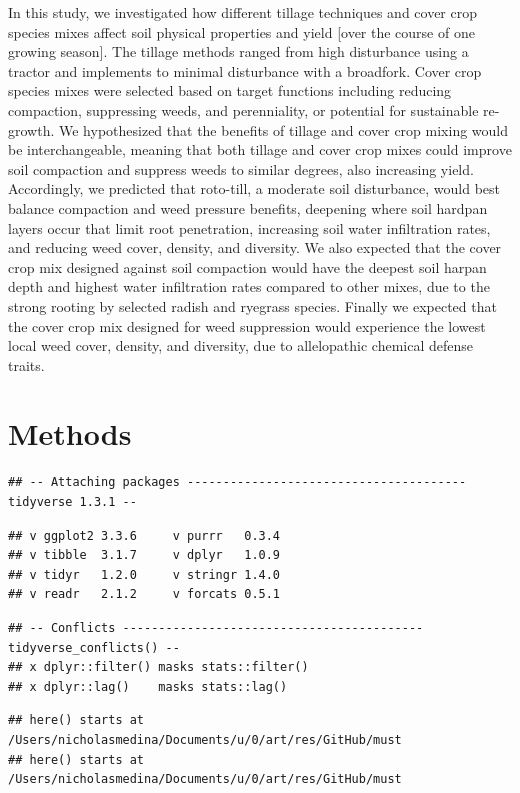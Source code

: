 \documentclass[
]{article}
\begin{document}
In this study, we investigated how different tillage techniques and cover crop species mixes affect soil physical properties and yield {[}over the course of one growing season{]}.
The tillage methods ranged from high disturbance using a tractor and implements to minimal disturbance with a broadfork.
Cover crop species mixes were selected based on target functions including reducing compaction, suppressing weeds, and perenniality, or potential for sustainable re-growth.
We hypothesized that the benefits of tillage and cover crop mixing would be interchangeable, meaning that both tillage and cover crop mixes could improve soil compaction and suppress weeds to similar degrees, also increasing yield.
Accordingly, we predicted that roto-till, a moderate soil disturbance, would best balance compaction and weed pressure benefits, deepening where soil hardpan layers occur that limit root penetration, increasing soil water infiltration rates, and reducing weed cover, density, and diversity.
We also expected that the cover crop mix designed against soil compaction would have the deepest soil harpan depth and highest water infiltration rates compared to other mixes, due to the strong rooting by selected radish and ryegrass species.
Finally we expected that the cover crop mix designed for weed suppression would experience the lowest local weed cover, density, and diversity, due to allelopathic chemical defense traits.

\hypertarget{methods}{%
\section{Methods}\label{methods}}

\begin{verbatim}
## -- Attaching packages --------------------------------------- tidyverse 1.3.1 --
\end{verbatim}

\begin{verbatim}
## v ggplot2 3.3.6     v purrr   0.3.4
## v tibble  3.1.7     v dplyr   1.0.9
## v tidyr   1.2.0     v stringr 1.4.0
## v readr   2.1.2     v forcats 0.5.1
\end{verbatim}

\begin{verbatim}
## -- Conflicts ------------------------------------------ tidyverse_conflicts() --
## x dplyr::filter() masks stats::filter()
## x dplyr::lag()    masks stats::lag()
\end{verbatim}

\begin{verbatim}
## here() starts at /Users/nicholasmedina/Documents/u/0/art/res/GitHub/must
## here() starts at /Users/nicholasmedina/Documents/u/0/art/res/GitHub/must
\end{verbatim}
\end{document}
